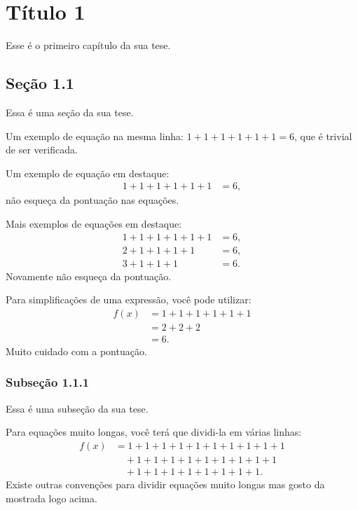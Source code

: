 \chapter{T\'itulo 1}
Esse \'e o primeiro cap\'itulo da sua tese.

\section{Se\c c\~ao 1.1}
Essa \'{e} uma se\c{c}\~{a}o da sua tese.

Um exemplo de equa\c{c}\~{a}o na mesma linha: 
$ 1 + 1 + 1 + 1 + 1 + 1 = 6$, 
que \'{e} trivial de ser verificada.

Um exemplo de equa\c{c}\~{a}o em destaque:
\begin{align*}
1 + 1 + 1 + 1 + 1 + 1 &= 6,
\end{align*}
n\~{a}o esque\c{c}a da pontua\c{c}\~{a}o nas equa\c{c}\~{o}es.

Mais exemplos de equa\c{c}\~{o}es em destaque:
\begin{align*}
1 + 1 + 1 + 1 + 1 + 1 &= 6, \\
2 + 1 + 1 + 1 + 1 &= 6, \\
3 + 1 + 1 + 1 &= 6.
\end{align*}
Novamente n\~{a}o esque\c{c}a da pontua\c{c}\~{a}o.

Para simplifica\c{c}\~{o}es de uma express\~{a}o, voc\^{e} pode utilizar:
\begin{align*}
    f(x) &= 1 + 1 + 1 + 1 + 1 + 1 \\
    &= 2 + 2 + 2 \\
    &= 6.
\end{align*}
Muito cuidado com a pontua\c{c}\~{a}o.

\subsection{Subse\c{c}\~ao 1.1.1}
Essa \'{e} uma subse\c{c}\~{a}o da sua tese.

Para equa\c{c}\~{o}es muito longas, voc\^{e} ter\'a que dividi-la em v\'arias linhas:
\begin{align*}
    f(x) &= 1 + 1 + 1 + 1 + 1 + 1 + 1 + 1 + 1 + 1 \\
    &\quad {}+ 1 + 1 + 1 + 1 + 1 + 1 + 1 + 1 + 1 \\
    &\quad {}+ 1 + 1 + 1 + 1 + 1 + 1 + 1 + 1.
\end{align*}
Existe outras conven\c{c}\~{o}es para dividir equa\c{c}\~{o}es muito longas mas gosto da
mostrada logo acima.


